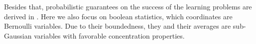 
Besides that, probabilistic guarantees on the success of the learning problems are derived in .
Here we also focus on boolean statistics, which coordinates are Bernoulli variables.
Due to their boundedness, they and their averages are sub-Gaussian variables with favorable concentration properties.
